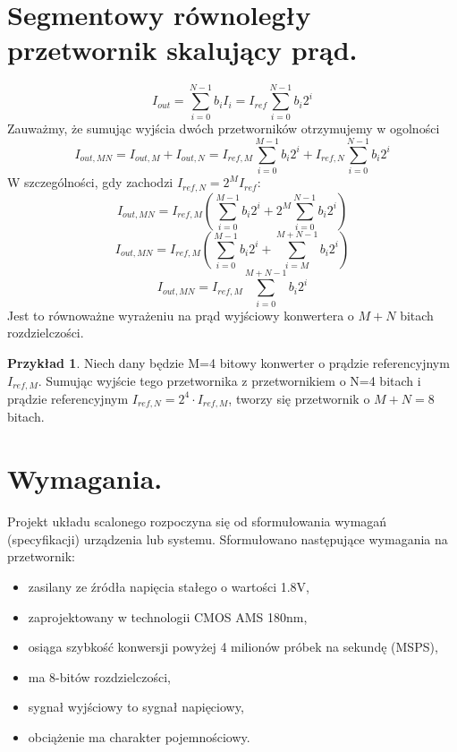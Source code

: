 \documentclass[10pt,a4paper]{report}
\theoremstyle{definition}
\theoremstyle{definition}
\theoremstyle{definition}
\newtheorem{przyklad}{Przykład}[section]
\theoremstyle{definition}
\theoremstyle{definition}
\begin{document}
	\section{Segmentowy równoległy przetwornik skalujący prąd.}
{	
	\begin{equation}
	I_{out} = \sum_{i=0}^{N-1} b_i I_{i} = I_{ref} \sum_{i=0}^{N-1} b_i 2^{i}
	\end{equation}
	Zauważmy, że sumując wyjścia dwóch przetworników otrzymujemy w ogolności
	\begin{equation}
	I_{out,MN} = I_{out,M} + I_{out,N}
	= I_{ref,M} \sum_{i=0}^{M-1} b_i 2^{i} + I_{ref,N} \sum_{i=0}^{N-1} b_i 2^{i}
	\end{equation}
	W szczególności, gdy zachodzi $I_{ref,N} = 2^M I_{ref} $:
	\begin{equation}
	I_{out,MN} = I_{ref,M}\left(\sum_{i=0}^{M-1} b_i 2^{i} + 2^M \sum_{i=0}^{N-1} b_i 2^{i}\right) 
	\end{equation}
	\begin{equation}
	I_{out,MN} = I_{ref,M}\left(\sum_{i=0}^{M-1} b_i 2^{i} + \sum_{i=M}^{M+N-1} b_i 2^{i}\right) 
	\end{equation}
	\begin{equation}
	I_{out,MN} = I_{ref,M} \sum_{i=0}^{M+N-1} b_i 2^{i}
	\end{equation}
	Jest to równoważne wyrażeniu na prąd wyjściowy konwertera o $M+N$ bitach rozdzielczości.
	\begin{przyklad}{Niech dany będzie M=4 bitowy konwerter o prądzie referencyjnym $I_{ref,M}$. Sumując wyjście tego przetwornika z przetwornikiem o N=4 bitach i prądzie referencyjnym $ I_{ref,N} = 2^4 \cdot I_{ref,M} $, tworzy się przetwornik o $M+N=8$ bitach.}
	\end{przyklad}	
}

	\section{Wymagania.}
{	Projekt układu scalonego rozpoczyna się od sformułowania wymagań (specyfikacji) urządzenia lub systemu. Sformułowano następujące wymagania na przetwornik:
	\begin{itemize}
		\item zasilany ze źródła napięcia stałego o wartości 1.8V,
		\item zaprojektowany w technologii CMOS AMS 180nm,
		\item osiąga szybkość konwersji powyżej 4 milionów próbek na sekundę (MSPS),
		\item ma 8-bitów rozdzielczości,
		\item sygnał wyjściowy to sygnał napięciowy,
		\item obciążenie ma charakter pojemnościowy.
\end{itemize} }
\end{document}
